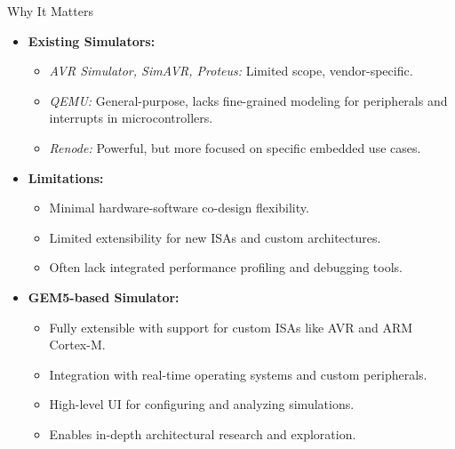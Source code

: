 \begin{frame}{Why It Matters}
  \begin{itemize}
    \item \textbf{Existing Simulators:}
    \begin{itemize}
      \item \textit{AVR Simulator, SimAVR, Proteus:} Limited scope, vendor-specific.
      \item \textit{QEMU:} General-purpose, lacks fine-grained modeling for peripherals and interrupts in microcontrollers.
      \item \textit{Renode:} Powerful, but more focused on specific embedded use cases.
    \end{itemize}
    \item \textbf{Limitations:}
    \begin{itemize}
      \item Minimal hardware-software co-design flexibility.
      \item Limited extensibility for new ISAs and custom architectures.
      \item Often lack integrated performance profiling and debugging tools.
    \end{itemize}
    \item \textbf{GEM5-based Simulator:}
    \begin{itemize}
      \item Fully extensible with support for custom ISAs like AVR and ARM Cortex-M.
      \item Integration with real-time operating systems and custom peripherals.
      \item High-level UI for configuring and analyzing simulations.
      \item Enables in-depth architectural research and exploration.
    \end{itemize}
  \end{itemize}
\end{frame}

